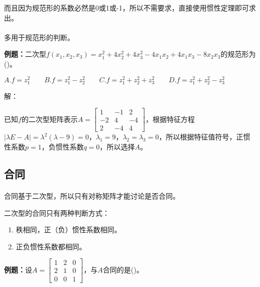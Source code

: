 而且因为规范形的系数必然是0或1或-1，所以不需要求，直接使用惯性定理即可求出。

\paragraph{}

多用于规范形的判断。

\textbf{例题：}二次型$f(x_1,x_2,x_3)=x_1^2+4x_2^2+4x_3^2-4x_1x_2+4x_1x_3-8x_2x_3$的规范形为()。

$A.f=z_1^2\qquad B.f=z_1^2-z_2^2\qquad C.f=z_1^2+z_2^2+z_3^2\qquad D.f=z_1^2+z_2^2-z_3^2$

解：

已知$f$的二次型矩阵表示$A=\left[\begin{array}{ccc}
    1 & -1 & 2 \\
    -2 & 4 & -4 \\
    2 & -4 & 4
\end{array}\right]$，根据特征方程$\vert\lambda E-A\vert=\lambda^2(\lambda-9)=0$，$\lambda_1=9$，$\lambda_2=\lambda_3=0$，所以根据特征值符号，正惯性系数$p=1$，负惯性系数$q=0$，所以选择$A$。

\subsection{合同}

\paragraph{}

合同基于二次型，所以只有对称矩阵才能讨论是否合同。

二次型的合同只有两种判断方式：

\begin{enumerate}
    \item 秩相同，正（负）惯性系数相同。
    \item 正负惯性系数都相同。
\end{enumerate}

\textbf{例题：}设$A=\left[\begin{array}{ccc}
    1 & 2 & 0 \\
    2 & 1 & 0 \\
    0 & 0 & 1
\end{array}\right]$，与$A$合同的是()。

